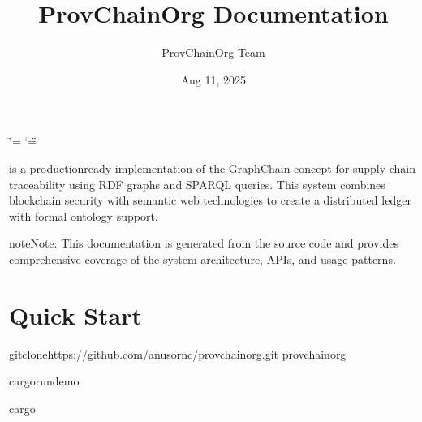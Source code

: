 \documentclass[letterpaper,10pt,english]{sphinxmanual}
\title{ProvChainOrg Documentation}
\date{Aug 11, 2025}
\author{ProvChainOrg Team}
\begin{document}
\ifdefined\shorthandoff
  \ifnum\catcode`\=\string=\active\shorthandoff{=}\fi
  \ifnum\catcode`\"=\active{}\fi
\fi

\pagestyle{empty}
\sphinxmaketitle
\pagestyle{plain}
\sphinxtableofcontents
\pagestyle{normal}
\label{\detokenize{index::doc}}


\noindent{}

\noindent{}

\noindent{}

\sphinxAtStartPar
{} is a production\sphinxhyphen{}ready implementation of the GraphChain concept for supply chain traceability using RDF graphs and SPARQL queries. This system combines blockchain security with semantic web technologies to create a distributed ledger with formal ontology support.

\begin{sphinxadmonition}{note}{Note:}
\sphinxAtStartPar
This documentation is generated from the source code and provides comprehensive coverage of the system architecture, APIs, and usage patterns.
\end{sphinxadmonition}


\chapter{Quick Start}
\label{\detokenize{index:quick-start}}
\begin{sphinxVerbatim}[commandchars=\\\{\}]
gitclonehttps://github.com/anusornc/provchain\PYGZhy{}org.git
provchain\PYGZhy{}org

cargorundemo

cargo
\end{sphinxVerbatim}
\end{document}
